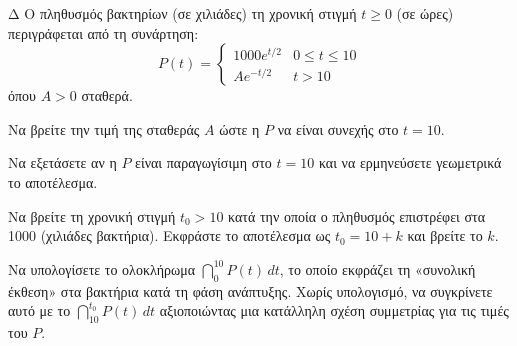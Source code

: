 \begin{thema}{Δ}
Ο πληθυσμός βακτηρίων (σε χιλιάδες) τη χρονική στιγμή $t \ge 0$ (σε ώρες) περιγράφεται από τη συνάρτηση:
\[ P(t) = \begin{cases} 1000 e^{t/2} & 0 \le t \le 10 \\ A e^{-t/2} & t > 10 \end{cases} \]
όπου $A > 0$ σταθερά.
\begin{erwthma}
    \item Να βρείτε την τιμή της σταθεράς $A$ ώστε η $P$ να είναι συνεχής στο $t = 10$.
    \item Να εξετάσετε αν η $P$ είναι παραγωγίσιμη στο $t = 10$ και να ερμηνεύσετε γεωμετρικά το αποτέλεσμα.
    \item Να βρείτε τη χρονική στιγμή $t_0 > 10$ κατά την οποία ο πληθυσμός επιστρέφει στα 1000 (χιλιάδες βακτήρια). Εκφράστε το αποτέλεσμα ως $t_0 = 10 + k$ και βρείτε το $k$.
    \item Να υπολογίσετε το ολοκλήρωμα $\displaystyle\dint_0^{10} P(t)\,dt$, το οποίο εκφράζει τη «συνολική έκθεση» στα βακτήρια κατά τη φάση ανάπτυξης. Χωρίς υπολογισμό, να συγκρίνετε αυτό με το $\displaystyle\dint_{10}^{t_0} P(t)\,dt$ αξιοποιώντας μια κατάλληλη σχέση συμμετρίας για τις τιμές του $P$.
\end{erwthma}
\end{thema}
